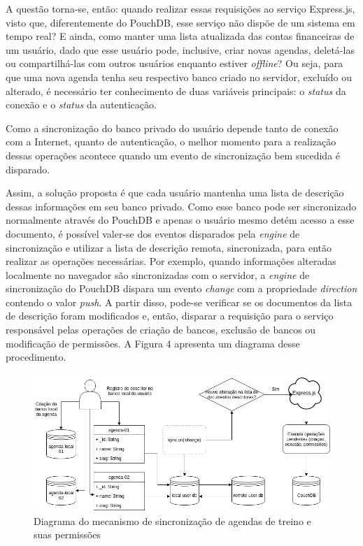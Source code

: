 \documentclass[
	article,			%
	11pt,				%
	oneside,			%
	a4paper,			%
	english,			%
	brazil,				%
	sumario=tradicional
	]{abntex2}
\begin{document}
A questão torna-se, então: quando realizar essas requisições ao serviço Express.js, visto que, diferentemente do PouchDB, esse serviço não dispõe de um sistema em tempo real? E ainda, como manter uma lista atualizada das contas financeiras de um usuário, dado que esse usuário pode, inclusive, criar novas agendas, deletá-las ou compartilhá-las com outros usuários enquanto estiver \textit{offline}? Ou seja, para que uma nova agenda tenha seu respectivo banco criado no servidor, excluído ou alterado, é necessário ter conhecimento de duas variáveis principais: o \textit{status} da conexão e o \textit{status} da autenticação.

Como a sincronização do banco privado do usuário depende tanto de conexão com a Internet, quanto de autenticação, o melhor momento para a realização dessas operações acontece quando um evento de sincronização bem sucedida é disparado.

Assim, a solução proposta é que cada usuário mantenha uma lista de descrição dessas informações em seu banco privado. Como esse banco pode ser sincronizado normalmente através do PouchDB e apenas o usuário mesmo detém acesso a esse documento, é possível valer-se dos eventos disparados pela \textit{engine} de sincronização e utilizar a lista de descrição remota, sincronizada, para então realizar as operações necessárias. Por exemplo, quando informações alteradas localmente no navegador são sincronizadas com o servidor, a \textit{engine} de sincronização do PouchDB dispara um evento \textit{change} com a propriedade \textit{direction }contendo o valor \textit{push}. A partir disso, pode-se verificar se os documentos da lista de descrição foram modificados e, então, disparar a requisição para o serviço responsável pelas operações de criação de bancos, exclusão de bancos ou modificação de permissões. A Figura 4 apresenta um diagrama desse procedimento.

\begin{figure}[H]
	\centering
	\caption{Diagrama do mecanismo de sincronização de agendas de treino e suas permissões}
	\includegraphics[width=1\textwidth]{figures/riffnailer-sync-database-creation}
\end{figure}
\end{document}
